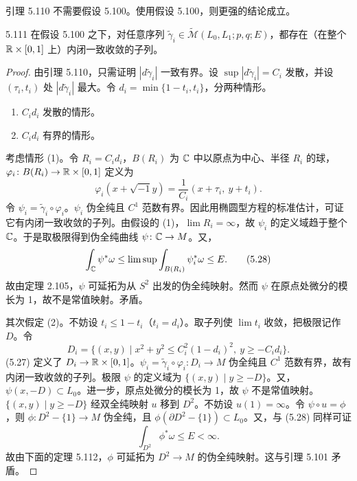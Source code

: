 引理 5.110 不需要假设 5.100。使用假设 5.100，则更强的结论成立。

\begin{lemma*}{5.111}
  在假设 5.100 之下，对任意序列 $\tilde\gamma_i\in\tilde{\mathcal{M}}(L_0,L_1;p,q;E)$，都存在（在整个 $\mathbb{R}\times[0,1]$ 上）内闭一致收敛的子列。
\end{lemma*}

\begin{proof}
  由引理 5.110，只需证明 $|d\tilde\gamma_i|$ 一致有界。设 $\sup|d\tilde\gamma_i|=C_i$ 发散，并设 $(\tau_i,t_i)$ 处 $|d\tilde\gamma_i|$ 最大。令 $d_i=\min\{1-t_i,t_i\}$，分两种情形。
  \begin{enumerate}[label=(\arabic*),leftmargin=2.4em,itemsep=1pt,topsep=2pt]
    \item $C_id_i$ 发散的情形。
    \item $C_id_i$ 有界的情形。
  \end{enumerate}
  考虑情形 (1)。令 $R_i=C_id_i$，$B(R_i)$ 为 $\mathbb{C}$ 中以原点为中心、半径 $R_i$ 的球，$\varphi_i\colon B(R_i)\to\mathbb{R}\times[0,1]$ 定义为
  \begin{equation}
    \varphi_i(x+\sqrt{-1}y)=\frac{1}{C_i}(x+\tau_i,\ y+t_i). \tag{5.27}
  \end{equation}
  令 $\psi_i=\tilde\gamma_i\circ\varphi_i$。$\psi_i$ 伪全纯且 $C^1$ 范数有界。因此用椭圆型方程的标准估计，可证它有内闭一致收敛的子列。由假设的 (1)，$\lim R_i=\infty$，故 $\psi_i$ 的定义域趋于整个 $\mathbb{C}$。于是取极限得到伪全纯曲线 $\psi\colon\mathbb{C}\to M$。又，
  \begin{equation}
    \int_{\mathbb{C}}\psi^*\omega\le\limsup\int_{B(R_i)}\psi_i^*\omega\le E . \tag{5.28}
  \end{equation}
  故由定理 2.105，$\psi$ 可延拓为从 $S^2$ 出发的伪全纯映射。然而 $\psi$ 在原点处微分的模长为 1，故不是常值映射。矛盾。

  其次假定 (2)。不妨设 $t_i\le 1-t_i$（$t_i=d_i$）。取子列使 $\lim t_i$ 收敛，把极限记作 $D$。令
\[
D_i=\{(x,y)\mid x^2+y^2\le C_i^2(1-d_i)^2,\ y\ge -C_id_i\}.
\]
(5.27) 定义了 $D_i\to\mathbb{R}\times[0,1]$。$\psi_i=\tilde\gamma_i\circ\varphi_i\colon D_i\to M$ 伪全纯且 $C^1$ 范数有界，故有内闭一致收敛的子列。极限 $\psi$ 的定义域为 $\{(x,y)\mid y\ge -D\}$。又，$\psi(x,-D)\subset L_0$。进一步，原点处微分的模长为 1，故 $\psi$ 不是常值映射。$\{(x,y)\mid y\ge -D\}$ 经双全纯映射 $u$ 移到 $D^2$。不妨设 $u(1)=\infty$。令 $\psi\circ u=\phi$，则 $\phi\colon D^2-\{1\}\to M$ 伪全纯，且 $\phi(\partial D^2-\{1\})\subset L_0$。又，与 (5.28) 同样可证
\begin{equation}
  \int_{D^2}\phi^*\omega\le E<\infty . \tag{5.29}
\end{equation}
故由下面的定理 5.112，$\phi$ 可延拓为 $D^2\to M$ 的伪全纯映射。这与引理 5.101 矛盾。
\end{proof}

